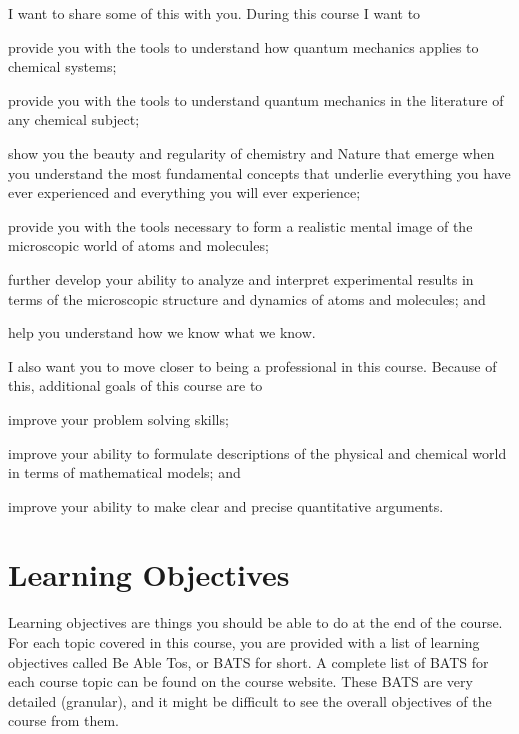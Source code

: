 \documentclass[letterpaper,oneside,onecolumn,11pt,article]{memoir}
\begin{document}
I want to share some of this with you. During this course I want to 
\begin{inparaenum}
\item provide you with the tools to understand how quantum mechanics applies to chemical systems;
\item provide you with the tools to understand quantum mechanics in the literature of any chemical subject;
\item show you the beauty and regularity of chemistry and Nature that emerge when you understand the most fundamental concepts that underlie everything you have ever experienced and everything you will ever experience;
\item provide you with the tools necessary to form a realistic mental image of the microscopic world of atoms and molecules;
\item further develop your ability to analyze and interpret experimental results in terms of the microscopic structure and dynamics of atoms and molecules; and
\item help you understand how we know what we know.
\end{inparaenum}

I also want you to move closer to being a professional in this course. Because of this, additional goals of this course are to
\begin{inparaenum}
\item improve your problem solving skills;
\item improve your ability to formulate descriptions of the physical and chemical world in terms of mathematical models; and
\item improve your ability to make clear and precise quantitative arguments.
\end{inparaenum}
%
%
\section{Learning Objectives}
Learning objectives are things you should be able to do at the end of the course. For each topic covered in this course, you are provided with a list of learning objectives called Be Able Tos, or BATS for short. A complete list of BATS for each course topic can be found on the course website. These BATS are very detailed (granular), and it might be difficult to see the overall objectives of the course from them.
\end{document}
